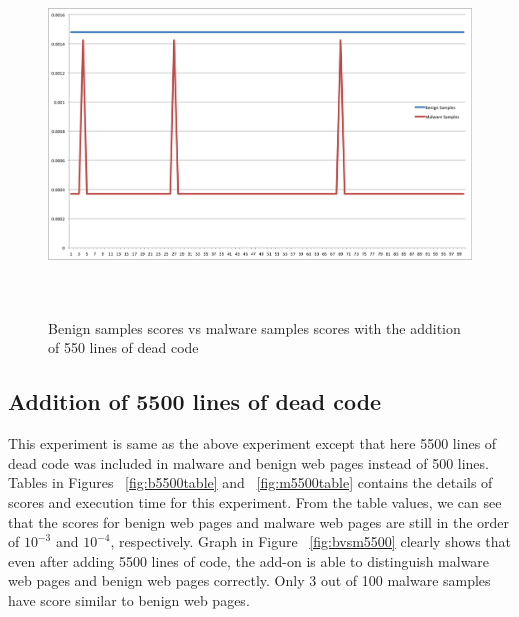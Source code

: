 \begin{figure}[h]
    \centering
    \includegraphics[width=16cm, height=9.53cm]{500.png}
    \caption[Benign Samples vs Malware Samples]{Benign samples scores vs malware samples scores with the addition of 550 lines of dead code}
    \label{fig:bvsm500}
\end{figure}


\subsection{Addition of 5500 lines of dead code}
This experiment is same as the above experiment except that here 5500 lines of dead code was included in malware and benign web pages instead of 500 lines. Tables in Figures ~\ref{fig:b5500table} and  ~\ref{fig:m5500table} contains the details of scores and execution time for this experiment. From the table values, we can see that the scores for benign web pages and malware web pages are still in the order of $10^{-3}$ and $10^{-4}$, respectively. Graph in Figure ~\ref{fig:bvsm5500} clearly shows that even after adding 5500 lines of code, the add-on is able to distinguish malware web pages and benign web pages correctly. Only 3 out of 100 malware samples have score similar to benign web pages.

